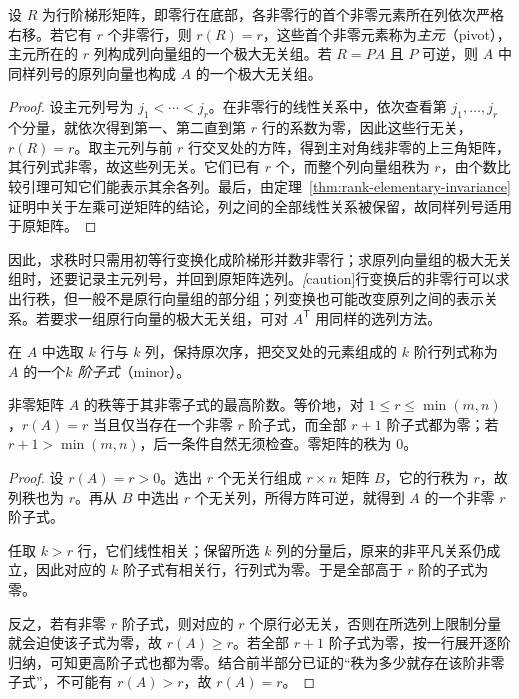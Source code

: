 \begin{proposition}
\label{prop:echelon-rank-pivot-columns}
设 $R$ 为行阶梯形矩阵，即零行在底部，各非零行的首个非零元素所在列依次严格右移。若它有 $r$ 个非零行，则 $r(R)=r$，这些首个非零元素称为\emph{主元}（pivot），主元所在的 $r$ 列构成列向量组的一个极大无关组。若 $R=PA$ 且 $P$ 可逆，则 $A$ 中同样列号的原列向量也构成 $A$ 的一个极大无关组。
\end{proposition}

\begin{proof}
设主元列号为 $j_1<\cdots<j_r$。在非零行的线性关系中，依次查看第 $j_1,\ldots,j_r$ 个分量，就依次得到第一、第二直到第 $r$ 行的系数为零，因此这些行无关，$r(R)=r$。取主元列与前 $r$ 行交叉处的方阵，得到主对角线非零的上三角矩阵，其行列式非零，故这些列无关。它们已有 $r$ 个，而整个列向量组秩为 $r$，由个数比较引理可知它们能表示其余各列。最后，由定理~\ref{thm:rank-elementary-invariance} 证明中关于左乘可逆矩阵的结论，列之间的全部线性关系被保留，故同样列号适用于原矩阵。
\end{proof}

因此，求秩时只需用初等行变换化成阶梯形并数非零行；求原列向量组的极大无关组时，还要记录主元列号，并回到原矩阵选列。\emph[caution]{行变换后的非零行可以求出行秩，但一般不是原行向量组的部分组；列变换也可能改变原列之间的表示关系}。若要求一组原行向量的极大无关组，可对 $A^{\mathsf T}$ 用同样的选列方法。

\begin{definition}
\label{def:matrix-minor}
在 $A$ 中选取 $k$ 行与 $k$ 列，保持原次序，把交叉处的元素组成的 $k$ 阶行列式称为 $A$ 的一个\emph{$k$ 阶子式}（minor）。
\end{definition}

\begin{theorem}
\label{thm:rank-by-minors}
非零矩阵 $A$ 的秩等于其非零子式的最高阶数。等价地，对 $1\leq r\leq\min(m,n)$，$r(A)=r$ 当且仅当存在一个非零 $r$ 阶子式，而全部 $r+1$ 阶子式都为零；若 $r+1>\min(m,n)$，后一条件自然无须检查。零矩阵的秩为 $0$。
\end{theorem}

\begin{proof}
设 $r(A)=r>0$。选出 $r$ 个无关行组成 $r\times n$ 矩阵 $B$，它的行秩为 $r$，故列秩也为 $r$。再从 $B$ 中选出 $r$ 个无关列，所得方阵可逆，就得到 $A$ 的一个非零 $r$ 阶子式。

任取 $k>r$ 行，它们线性相关；保留所选 $k$ 列的分量后，原来的非平凡关系仍成立，因此对应的 $k$ 阶子式有相关行，行列式为零。于是全部高于 $r$ 阶的子式为零。

反之，若有非零 $r$ 阶子式，则对应的 $r$ 个原行必无关，否则在所选列上限制分量就会迫使该子式为零，故 $r(A)\geq r$。若全部 $r+1$ 阶子式为零，按一行展开逐阶归纳，可知更高阶子式也都为零。结合前半部分已证的“秩为多少就存在该阶非零子式”，不可能有 $r(A)>r$，故 $r(A)=r$。
\end{proof}

